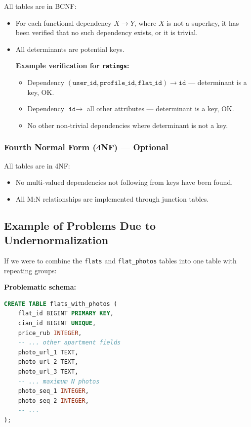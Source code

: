 \documentclass[12pt,a4paper]{article}
\begin{document}
All tables are in BCNF:
\begin{itemize}
    \item For each functional dependency $X \rightarrow Y$, where $X$ is not a superkey, it has been verified that no such dependency exists, or it is trivial.
    \item All determinants are potential keys.
    
    \textbf{Example verification for \texttt{ratings}:}
    \begin{itemize}
        \item Dependency $(\texttt{user\_id}, \texttt{profile\_id}, \texttt{flat\_id}) \rightarrow \texttt{id}$ — determinant is a key, OK.
        \item Dependency $\texttt{id} \rightarrow$ all other attributes — determinant is a key, OK.
        \item No other non-trivial dependencies where determinant is not a key.
    \end{itemize}
\end{itemize}

\subsubsection{Fourth Normal Form (4NF) — Optional}

All tables are in 4NF:
\begin{itemize}
    \item No multi-valued dependencies not following from keys have been found.
    \item All M:N relationships are implemented through junction tables.
\end{itemize}

\subsection{Example of Problems Due to Undernormalization}

If we were to combine the \texttt{flats} and \texttt{flat\_photos} tables into one table with repeating groups:

\textbf{Problematic schema:}
\begin{lstlisting}[language=SQL]
CREATE TABLE flats_with_photos (
    flat_id BIGINT PRIMARY KEY,
    cian_id BIGINT UNIQUE,
    price_rub INTEGER,
    -- ... other apartment fields
    photo_url_1 TEXT,
    photo_url_2 TEXT,
    photo_url_3 TEXT,
    -- ... maximum N photos
    photo_seq_1 INTEGER,
    photo_seq_2 INTEGER,
    -- ...
);
\end{lstlisting}
\end{document}
